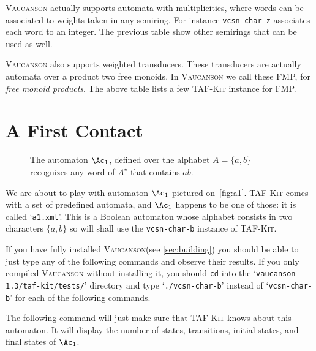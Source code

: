\documentclass[a4paper]{report}
\def\VcsnVersion{1.3}
\newcommand\file[1]{`\texttt{#1}'}
\newcommand\command[1]{\texttt{#1}}
\newcommand\samp[1]{`\texttt{#1}'}
\newcommand{\tafkit}{\textsc{TAF-Kit}\xspace}
\newcommand{\Vauc}{\textsc{Vaucanson}\xspace}
\begin{document}
\Vauc actually supports automata with multiplicities, where words can
be associated to weights taken in any semiring.  For instance
\command{vcsn-char-z} associates each word to an integer.  The previous
table show other semirings that can be used as well.

\Vauc also supports weighted transducers.  These transducers are
actually automata over a product two free monoids.  In \Vauc we call
these FMP, for \emph{free monoid products}.  The above table lists a
few \tafkit instance for FMP.

\section{A First Contact}\label{sec:firstcontact}

\begin{figure}[tbp] \centering
  \caption{The automaton $\Ac_1$, defined over the alphabet
    $A=\{a,b\}$ recognizes any word of $A^\star$ that
    contains $ab$. \label{fig:a1}}
\end{figure}

We are about to play with automaton $\Ac_1$ pictured
on~\autoref{fig:a1}.  \tafkit comes with a set of predefined automata,
and $\Ac_1$ happens to be one of those: it is called \file{a1.xml}.
This is a Boolean automaton whose alphabet consists in two characters
$\{a,b\}$ so will shall use the \command{vcsn-char-b} instance of
\tafkit.

If you have fully installed \Vauc (see \autoref{sec:building}) you
should be able to just type any of the following commands and observe
their results.  If you only compiled \Vauc without installing it, you
should \command{cd} into the
\file{vaucanson-\VcsnVersion/taf-kit/tests/} directory and type
\samp{./vcsn-char-b} instead of \samp{vcsn-char-b} for each of the
following commands.

The following command will just make sure that \tafkit knows about
this automaton.  It will display the number of states, transitions,
initial states, and final states of $\Ac_1$.
\end{document}
